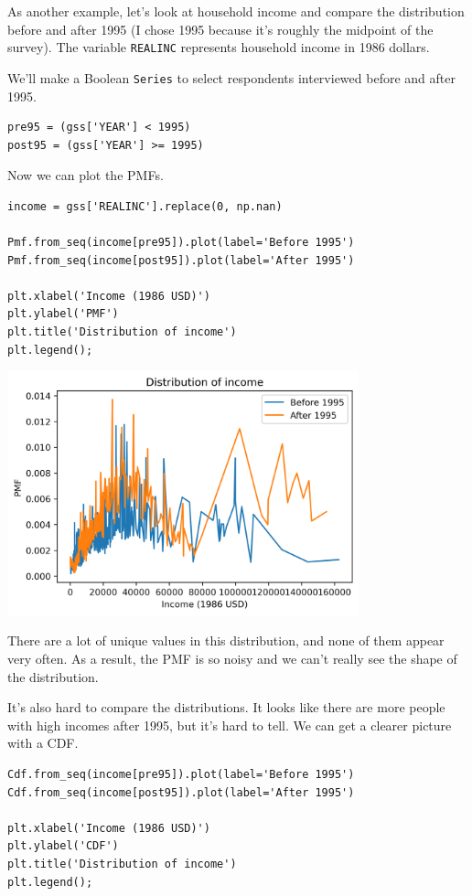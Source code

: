As another example, let's look at household income and compare the
distribution before and after 1995 (I chose 1995 because it's roughly
the midpoint of the survey). The variable
\passthrough{\lstinline!REALINC!} represents household income in 1986
dollars.

We'll make a Boolean \passthrough{\lstinline!Series!} to select
respondents interviewed before and after 1995.

\begin{lstlisting}[]
pre95 = (gss['YEAR'] < 1995)
post95 = (gss['YEAR'] >= 1995)
\end{lstlisting}

Now we can plot the PMFs.

\begin{lstlisting}[]
income = gss['REALINC'].replace(0, np.nan)

Pmf.from_seq(income[pre95]).plot(label='Before 1995')
Pmf.from_seq(income[post95]).plot(label='After 1995')

plt.xlabel('Income (1986 USD)')
plt.ylabel('PMF')
plt.title('Distribution of income')
plt.legend();
\end{lstlisting}

\begin{center}
\includegraphics[width=4in]{chapters/08_distributions_files/08_distributions_99_0.png}
\end{center}

There are a lot of unique values in this distribution, and none of them
appear very often. As a result, the PMF is so noisy and we can't really
see the shape of the distribution.

It's also hard to compare the distributions. It looks like there are
more people with high incomes after 1995, but it's hard to tell. We can
get a clearer picture with a CDF.

\begin{lstlisting}[]
Cdf.from_seq(income[pre95]).plot(label='Before 1995')
Cdf.from_seq(income[post95]).plot(label='After 1995')

plt.xlabel('Income (1986 USD)')
plt.ylabel('CDF')
plt.title('Distribution of income')
plt.legend();
\end{lstlisting}


